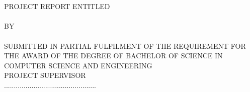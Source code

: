 
\begin{titlepage}
	\large
	\begin{center}

		{\scshape \univname\par}\vspace{1cm}         %

		\textsc{\facname}\\[0.08cm]                    %

		\textsc{\deptname}\\[0.8cm]                    %

		\vspace{0.2cm}
		\textsc{\normalsize PROJECT REPORT ENTITLED}\\[0.12cm]
		\textsc{\normalsize \ttitle}\\[0.5cm]          %

		\textsc{\normalsize BY}\\[0.5cm]
		\textsc{\authorname}\\[1cm]                    %

		\textsc{SUBMITTED IN PARTIAL FULFILMENT OF THE REQUIREMENT FOR THE AWARD OF THE DEGREE OF BACHELOR OF SCIENCE IN COMPUTER SCIENCE AND ENGINEERING }\\[1cm]
		\textsc{\normalsize PROJECT SUPERVISOR}\\[1cm]

		...............................................

			{\supname}\\[0.8cm]                            %

		{\normalsize \submissionplace\\ \submissiondate}\\  %

	\end{center}
\end{titlepage}
